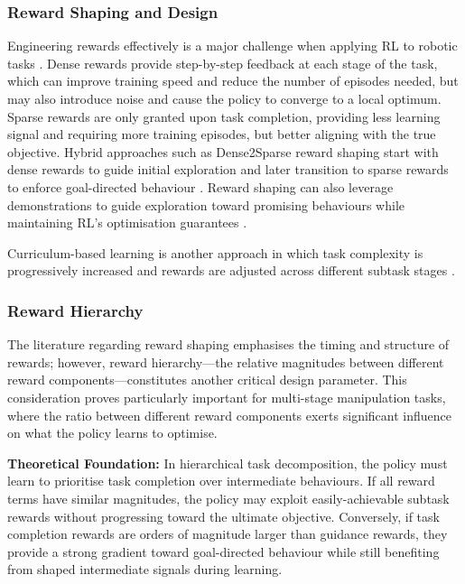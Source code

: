 \documentclass[12pt,a4paper,oneside]{report}
\begin{document}
\subsubsection{Reward Shaping and Design}

Engineering rewards effectively is a major challenge when applying RL to robotic tasks \cite{orsulaComprehensiveOverviewReward2024}. Dense rewards provide step-by-step feedback at each stage of the task, which can improve training speed and reduce the number of episodes needed, but may also introduce noise and cause the policy to converge to a local optimum. Sparse rewards are only granted upon task completion, providing less learning signal and requiring more training episodes, but better aligning with the true objective. Hybrid approaches such as Dense2Sparse reward shaping start with dense rewards to guide initial exploration and later transition to sparse rewards to enforce goal-directed behaviour \cite{correaDeepReinforcementLearning2025b, boyaLargeLanguageModeldriven2025b}. Reward shaping can also leverage demonstrations to guide exploration toward promising behaviours while maintaining RL's optimisation guarantees \cite{brysReinforcementLearningDemonstrationd}.

Curriculum-based learning is another approach in which task complexity is progressively increased and rewards are adjusted across different subtask stages \cite{zhaoDense2SparseRewardShaping2020}.

\subsubsection{Reward Hierarchy}
The literature regarding reward shaping emphasises the timing and structure of rewards; however, reward hierarchy---the relative magnitudes between different reward components---constitutes another critical design parameter. This consideration proves particularly important for multi-stage manipulation tasks, where the ratio between different reward components exerts significant influence on what the policy learns to optimise.

\textbf{Theoretical Foundation:}
In hierarchical task decomposition, the policy must learn to prioritise task completion over intermediate behaviours. If all reward terms have similar magnitudes, the policy may exploit easily-achievable subtask rewards without progressing toward the ultimate objective. Conversely, if task completion rewards are orders of magnitude larger than guidance rewards, they provide a strong gradient toward goal-directed behaviour while still benefiting from shaped intermediate signals during learning.
\end{document}
